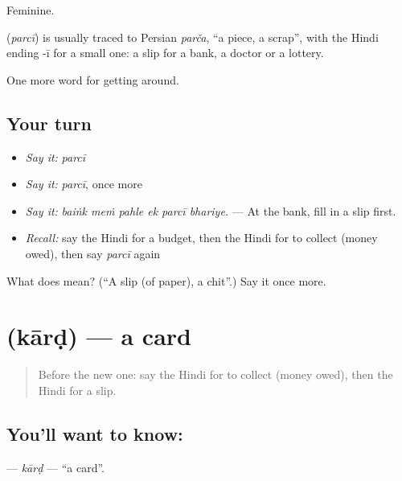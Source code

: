 Feminine.

\begin{cousinweb}
\textbf{} (\emph{parcī}) is usually traced to Persian \emph{parča}, \textquotedblleft{}a piece, a scrap\textquotedblright{}, with the Hindi ending -ī for a small one: a slip for a bank, a doctor or a lottery.
\end{cousinweb}

\begin{grammarlens}[title={What you've built}]
One more word for getting around.
\end{grammarlens}

\subsection*{Your turn}
\begin{itemize}
\raggedright
  \item \emph{Say it:} \emph{parcī}
  \item \emph{Say it:} \emph{parcī}, once more
  \item \emph{Say it:} \emph{baiṅk meṁ pahle ek parcī bhariye.} — At the bank, fill in a slip first.
  \item \emph{Recall:} say the Hindi for a budget, then the Hindi for to collect (money owed), then say \emph{parcī} again
\end{itemize}

\begin{tcolorbox}[breakable,colback=teal!4,colframe=teal!35!black,title={Before you move on}]
What does  mean? (\textquotedblleft{}A slip (of paper), a chit\textquotedblright{}.) Say it once more.
\end{tcolorbox}
\section[\texorpdfstring{\hi{कार्ड} (kārḍ)}{कार्ड (kārḍ)}]{ (kārḍ) — a card}

\label{lesson:HI-C429-kard}



\begin{quote}
Before the new one: say the Hindi for to collect (money owed), then the Hindi for a slip.
\end{quote}

\subsection*{You'll want to know: }
\textbf{} — \emph{kārḍ} — \textquotedblleft{}a card\textquotedblright{}.

